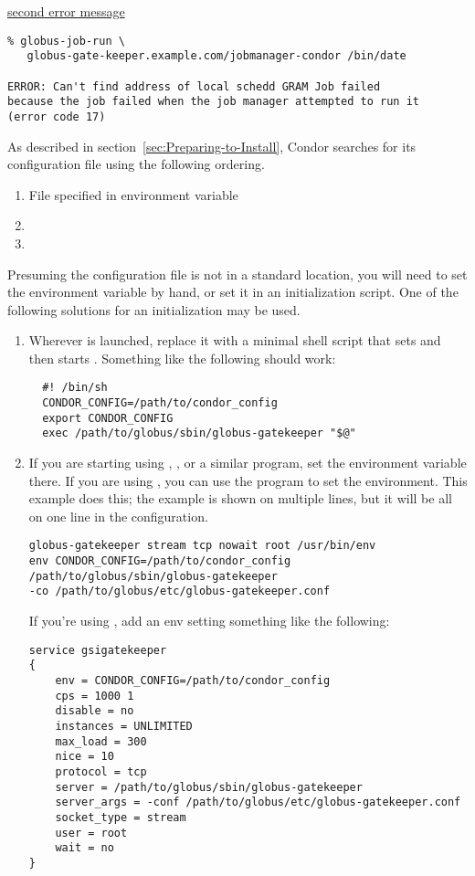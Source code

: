 \underline{second error message}
\begin{verbatim}
% globus-job-run \
   globus-gate-keeper.example.com/jobmanager-condor /bin/date

ERROR: Can't find address of local schedd GRAM Job failed
because the job failed when the job manager attempted to run it
(error code 17)
\end{verbatim}

As described in
section~\ref{sec:Preparing-to-Install}, 
Condor searches for its configuration file using the following
ordering.
\begin{enumerate}
\item File specified in  environment variable
\item {}
\item {}
\end{enumerate}

Presuming the configuration file is not in a standard location,
you will need to set the  environment variable
by hand, or set it in an initialization script.
One of the following solutions for an initialization may be used.
\begin{enumerate}
\item 
Wherever  is launched,
replace it with a minimal shell script that sets
 and then starts .
Something like the following should work:

\begin{verbatim}
  #! /bin/sh
  CONDOR_CONFIG=/path/to/condor_config
  export CONDOR_CONFIG
  exec /path/to/globus/sbin/globus-gatekeeper "$@"
\end{verbatim}
\item 
If you are starting  using ,
, or a similar program,
set the environment variable there.
If you are using , you can use the  program
to set the environment.
This example does this;
the example is shown on multiple lines,
but it will be all on one line in the  configuration. 
\begin{verbatim}
globus-gatekeeper stream tcp nowait root /usr/bin/env
env CONDOR_CONFIG=/path/to/condor_config
/path/to/globus/sbin/globus-gatekeeper
-co /path/to/globus/etc/globus-gatekeeper.conf
\end{verbatim}
If you're using , add an env setting
something like the following:
\begin{verbatim}
service gsigatekeeper
{
    env = CONDOR_CONFIG=/path/to/condor_config
    cps = 1000 1
    disable = no
    instances = UNLIMITED
    max_load = 300
    nice = 10
    protocol = tcp
    server = /path/to/globus/sbin/globus-gatekeeper
    server_args = -conf /path/to/globus/etc/globus-gatekeeper.conf
    socket_type = stream
    user = root
    wait = no
}
\end{verbatim}

\end{enumerate}

